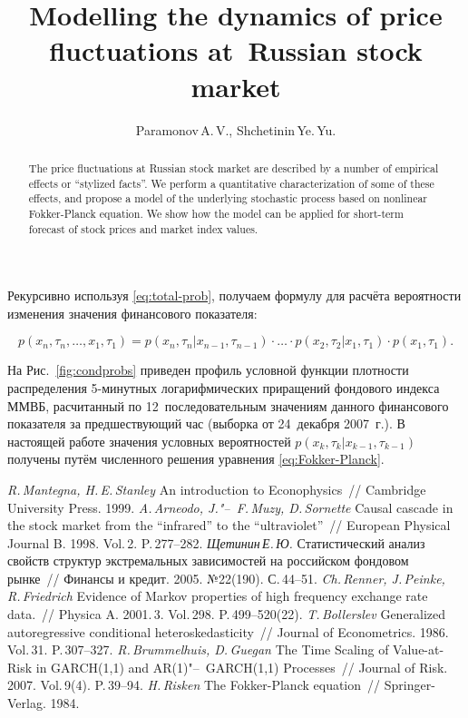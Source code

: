 \documentclass{mce-article}
\begin{document}
Рекурсивно используя \eqref{eq:total-prob}, получаем формулу для
расчёта вероятности изменения значения финансового показателя:

\begin{equation}
  p(x_n, \tau_n, \ldots, x_1, \tau_1)
  = p(x_n, \tau_n| x_{n - 1}, \tau_{n - 1}) \cdot \ldots
  \cdot p(x_2, \tau_2| x_1, \tau_1) \cdot p(x_1, \tau_1).
\end{equation}

На Рис.~\ref{fig:condprobs} приведен профиль условной функции
плотности распределения 5-минутных логарифмических приращений
фондового индекса ММВБ, расчитанный по 12~последовательным значениям
данного финансового показателя за предшествующий час (выборка от
24~декабря 2007~г.). В настоящей работе значения условных вероятностей
$p(x_k, \tau_k| x_{k - 1}, \tau_{k - 1})$ получены путём численного
решения уравнения \eqref{eq:Fokker-Planck}.

\begin{thebibliography}{99}
 \textit{R.\,Mantegna, H.\,E.\,Stanley} An
  introduction to Econophysics\ // Cambridge University Press. 1999.
 \textit{A.\,Arneodo, J."--~F.\,Muzy, D.\,Sornette}
  Causal cascade in the stock market from the ``infrared'' to the
  ``ultraviolet''\ // European Physical Journal
  B. 1998. Vol.\,2. P.\,277--282.
 \textit{Щетинин\,Е.\,Ю.}
  Статистический анализ свойств структур экстремальных зависимостей на
  российском фондовом рынке\ // Финансы и кредит.
  2005. №22(190). С.\,44--51.
 \textit{Ch.\,Renner, J.\,Peinke, R.\,Friedrich}
  Evidence of Markov properties of high frequency exchange rate data.\
  // Physica A. 2001.\,3. Vol.\,298. P.\,499--520(22).
 \textit{T.\,Bollerslev} Generalized
  autoregressive conditional heteroskedasticity\ // Journal of
  Econometrics. 1986. Vol.\,31. P.\,307--327.
 \textit{R.\,Brummelhuis, D.\,Guegan} The Time
  Scaling of Value-at-Risk in GARCH(1,1) and AR(1)"--~GARCH(1,1)
  Processes\ // Journal of Risk. 2007. Vol.\,9(4). P.\,39--94.
 \textit{H.\,Risken} The Fokker-Planck
  equation\ // Springer-Verlag. 1984.
\end{thebibliography}

\bigskip

\title{Modelling the dynamics of price fluctuations at~Russian stock
  market}

\author{Paramonov\,A.\,V., Shchetinin\,Ye.\,Yu.}

\maketitle

\begin{abstract}
  The price fluctuations at Russian stock market are described by a
  number of empirical effects or ``stylized facts''. We perform a
  quantitative characterization of some of these effects, and propose
  a model of the underlying stochastic process based on nonlinear
  Fokker-Planck equation. We show how the model can be applied for
  short-term forecast of stock prices and market index values.
\end{abstract}
\end{document}
